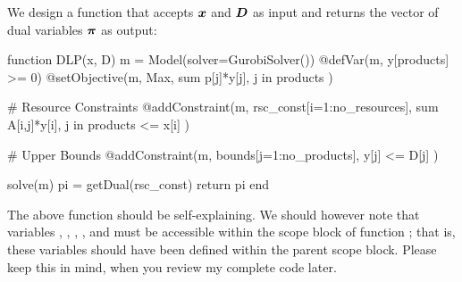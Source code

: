 We design a \julia{} function that accepts $\boldsymbol{x}$ and $\boldsymbol{D}$ as input and returns the vector of dual variables $\boldsymbol{\pi}$ as output:
\begin{code}
function DLP(x, D)
    m = Model(solver=GurobiSolver())
    @defVar(m, y[products] >= 0)
    @setObjective(m, Max, sum{ p[j]*y[j], j in products} )

    # Resource Constraints
    @addConstraint(m, rsc_const[i=1:no_resources],
            sum{ A[i,j]*y[i], j in products} <= x[i]  )

    # Upper Bounds
    @addConstraint(m, bounds[j=1:no_products], y[j] <= D[j] )

    solve(m)
    pi = getDual(rsc_const)
    return pi
end
\end{code}
\noindent The above function  should be self-explaining. We should however note that variables , , , , and  must be accessible within the scope block of function ; that is, these variables should have been defined within the parent scope block. Please keep this in mind, when you review my complete code later.

